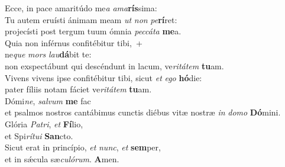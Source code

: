 \oddverse Ecce, in pace amaritúdo me\textit{a} \textit{a}\textit{ma}\textbf{rís}sima:\\
\evenverse Tu autem eruísti ánimam meam \textit{ut} \textit{non} \textit{pe}\textbf{rí}ret:~\*\\
\evenverse projecísti post tergum tuum ómnia \textit{pec}\textit{cá}\textit{ta} \textbf{me}a.\\
\oddverse Quia non inférnus confitébitur tibi,~+\\
\oddverse  ne\textit{que} \textit{mors} \textit{lau}\textbf{dá}bit te:~\*\\
\oddverse non exspectábunt qui descéndunt in lacum, ve\textit{ri}\textit{tá}\textit{tem} \textbf{tu}am.\\
\evenverse Vivens vivens ipse confitébitur tibi, sicut \textit{et} \textit{e}\textit{go} \textbf{hó}die:~\*\\
\evenverse pater fíliis notam fáciet ve\textit{ri}\textit{tá}\textit{tem} \textbf{tu}am.\\
\oddverse Dómi\textit{ne}, \textit{sal}\textit{vum} \textbf{me} fac~\*\\
\oddverse et psalmos nostros cantábimus cunctis diébus vitæ nostræ \textit{in} \textit{do}\textit{mo} \textbf{Dó}mini.\\
\evenverse Glória \textit{Pa}\textit{tri}, \textit{et} \textbf{Fí}lio,~\*\\
\evenverse et Spi\textit{rí}\textit{tu}\textit{i} \textbf{San}cto.\\
\oddverse Sicut erat in princípio, \textit{et} \textit{nunc}, \textit{et} \textbf{sem}per,~\*\\
\oddverse et in sǽcula sæ\textit{cu}\textit{ló}\textit{rum}. \textbf{A}men.\\
